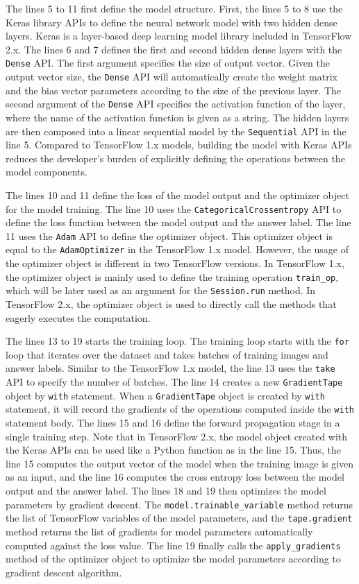 The lines 5 to 11 first define the model structure.
First, the lines 5 to 8 use the Keras library APIs to define the neural
network model with two hidden dense layers.
Keras is a layer-based deep learning model library included in TensorFlow 2.x.
The lines 6 and 7 defines the first and second hidden dense layers
with the {\tt Dense} API.
The first argument specifies the size of output vector.
Given the output vector size, the {\tt Dense} API will automatically create
the weight matrix and the bias vector parameters according to the size of 
the previous layer.
The second argument of the {\tt Dense} API 
specifies the activation function of the layer,
where the name of the activation function is given as a string. 
The hidden layers are then composed into a linear sequential model
by the {\tt Sequential} API in the line 5.
Compared to TensorFlow 1.x models, building the model with Keras APIs
reduces the developer's burden of explicitly defining the operations between 
the model components.

The lines 10 and 11 define the loss of the model output and
the optimizer object for the model training.
The line 10 uses the {\tt CategoricalCrossentropy} API to 
define the loss function between the model output and the answer label.
The line 11 uses the {\tt Adam} API to define the optimizer object.
This optimizer object is equal to the {\tt AdamOptimizer} in the TensorFlow
1.x model.
However, the usage of the optimizer object is different in two TensorFlow
versions.
In TensorFlow 1.x, the optimizer object is mainly used to define the
training operation {\tt train\_op}, which will be later used as an argument
for the {\tt Session.run} method.
In TensorFlow 2.x, the optimizer object is used to directly call the methods 
that eagerly executes the computation.

The lines 13 to 19 starts the training loop.
The training loop starts with the {\tt for} loop that iterates over the dataset
and takes batches of training images and answer labels.
Similar to the TensorFlow 1.x model,
the line 13 uses the {\tt take} API to specify the number of batches.
The line 14 creates a new {\tt GradientTape} object by {\tt with} statement.
When a {\tt GradientTape} object is created by {\tt with} statement,
it will record the gradients of the operations computed inside the {\tt with}
statement body.
The lines 15 and 16 define the forward propagation stage in a single
training step.
Note that in TensorFlow 2.x, the model object created with the Keras APIs can be
used like a Python function as in the line 15.
Thus, the line 15 computes the output vector of the model when the
training image is given as an input,
and the line 16 computes the cross entropy loss between the model output and
the answer label.
The lines 18 and 19 then optimizes the model parameters by gradient descent. 
The {\tt model.trainable\_variable} method returns the list of 
TensorFlow variables of the model parameters,
and the {\tt tape.gradient} method returns the list of
gradients for model parameters automatically computed against the
loss value.
The line 19 finally calls the {\tt apply\_gradients} method of the optimizer
object to optimize the model parameters according to gradient descent algorithm.


